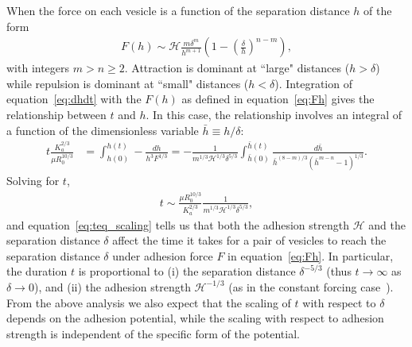 \documentclass[prf,superscriptaddress,showkeys]{revtex4-1}
\begin{document}
When the force on each vesicle is a function of the separation distance
$h$ of the form
\begin{align}
  \label{eq:Fh}
  F(h) \sim \mathcal{H} \frac{m\delta^m}{h^{m+1}}
    \left(1-\left(\frac{\delta}{h}\right)^{n-m}\right),
\end{align}
with integers $m>n\ge 2$.  Attraction is dominant at ``large"
distances ($h > \delta$) while repulsion is dominant at ``small"
distances ($h<\delta$).  Integration of equation~\eqref{eq:dhdt} with
the $F(h)$ as defined in equation~\eqref{eq:Fh} gives the relationship
between $t$ and $h$.  In this case, the relationship involves an
integral of a function of the dimensionless variable $\bar{h} \equiv
h/\delta$:
\begin{align*}
  t\frac{K_a^{2/3}}{\mu R_0^{10/3}}& = 
    \int^{h(t)}_{h(0)}-\frac{dh}{h^3 F^{1/3}} = 
    -\frac{1}{m^{1/3}\mathcal{H}^{1/3}\delta^{5/3}}\int^{\bar{h}(t)}_{\bar{h}(0)}
      \frac{d \bar{h}}{\bar{h}^{(8-m)/3}(\bar{h}^{m-n}-1)^{1/3}}.
\end{align*}
Solving for $t$,
\begin{align}
\label{eq:teq_scaling}
  t\sim \frac{\mu R_0^{10/3}}{K_a^{2/3}}\frac{1}{ m^{1/3} \mathcal{H}^{1/3}\delta^{5/3}},
\end{align}
and equation~\eqref{eq:teq_scaling} tells us that both the adhesion
strength $\mathcal{H}$ and the separation distance $\delta$ affect the
time it takes for a pair of vesicles to reach the separation distance
$\delta$ under adhesion force $F$ in equation~\eqref{eq:Fh}.  In
particular, the duration $t$ is proportional to (i) the separation
distance $\delta^{-5/3}$ (thus $t\rightarrow \infty$ as
$\delta\rightarrow 0$), and (ii) the adhesion strength
$\mathcal{H}^{-1/3}$ (as in the constant forcing
case~\cite{RamachandranLeal2010_PoF}).  From the above analysis we also
expect that the scaling of $t$ with respect to $\delta$ depends on the
adhesion potential, while the scaling with respect to adhesion strength
is independent of the specific form of the potential.
\end{document}
